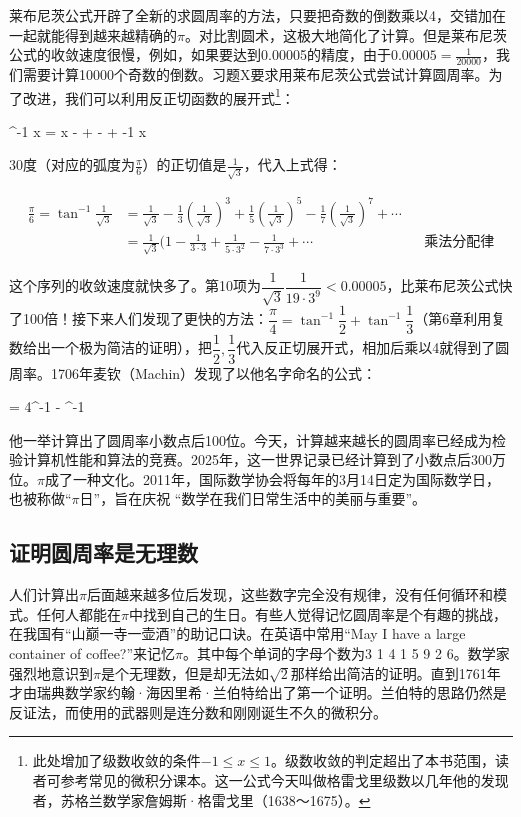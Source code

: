 \documentclass[b5paper]{ctexart}
\begin{document}
莱布尼茨公式开辟了全新的求圆周率的方法，只要把奇数的倒数乘以4，交错加在一起就能得到越来越精确的$\pi$。对比割圆术，这极大地简化了计算。但是莱布尼茨公式的收敛速度很慢，例如，如果要达到0.00005的精度，由于$0.00005 = \frac{1}{20000}$，我们需要计算10000个奇数的倒数。习题X要求用莱布尼茨公式尝试计算圆周率。为了改进，我们可以利用反正切函数的展开式\footnote{此处增加了级数收敛的条件$-1 \leq x \leq 1$。级数收敛的判定超出了本书范围，读者可参考常见的微积分课本。这一公式今天叫做格雷戈里级数以几年他的发现者，苏格兰数学家詹姆斯·格雷戈里（1638～1675）。}：

\be
\tan^{-1} x = x -  +  -  + \dotsb \quad {} -1 \leq x 
\ee

30度（对应的弧度为$\frac{\pi}{6}$）的正切值是$\frac{1}{\sqrt{3}}$，代入上式得：

\begin{align*}
\frac{\pi}{6} = \tan^{-1} \frac{1}{\sqrt{3}} &= \frac{1}{\sqrt{3}} - \frac{1}{3}(\frac{1}{\sqrt{3}})^3 + \frac{1}{5}(\frac{1}{\sqrt{3}})^5 - \frac{1}{7}(\frac{1}{\sqrt{3}})^7 + \dotsb \\
  &= \frac{1}{\sqrt{3}}(1 - \frac{1}{3 \cdot 3} + \frac{1}{5 \cdot 3^2} - \frac{1}{7 \cdot 3^3} + \dotsb && \text{乘法分配律}
\end{align*}

这个序列的收敛速度就快多了。第10项为$\dfrac{1}{\sqrt{3}}\dfrac{1}{19 \cdot 3^9} < 0.00005$，比莱布尼茨公式快了100倍！接下来人们发现了更快的方法：$\dfrac{\pi}{4} = \tan^{-1} \dfrac{1}{2} + \tan^{-1} \dfrac{1}{3}$（第6章利用复数给出一个极为简洁的证明），把$\dfrac{1}{2}, \dfrac{1}{3}$代入反正切展开式，相加后乘以4就得到了圆周率。1706年麦钦（Machin）发现了以他名字命名的公式\cite{Chronology-pi-2000}：


\be
{} = 4\tan^{-1}  - \tan^{-1} 
\ee

他一举计算出了圆周率小数点后100位。今天，计算越来越长的圆周率已经成为检验计算机性能和算法的竞赛。2025年，这一世界记录已经计算到了小数点后300万位。$\pi$成了一种文化。2011年，国际数学协会将每年的3月14日定为国际数学日，也被称做“$\pi$日”，旨在庆祝 “数学在我们日常生活中的美丽与重要”。

\subsection{证明圆周率是无理数}
人们计算出$\pi$后面越来越多位后发现，这些数字完全没有规律，没有任何循环和模式。任何人都能在$\pi$中找到自己的生日。有些人觉得记忆圆周率是个有趣的挑战，在我国有“山巅一寺一壶酒”的助记口诀。在英语中常用“May I have a large container of coffee?”来记忆$\pi$。其中每个单词的字母个数为3 1 4 1 5 9 2 6。数学家强烈地意识到$\pi$是个无理数，但是却无法如$\sqrt{2}$那样给出简洁的证明。直到1761年才由瑞典数学家约翰·海因里希·兰伯特给出了第一个证明。兰伯特的思路仍然是反证法，而使用的武器则是连分数和刚刚诞生不久的微积分。
\end{document}
